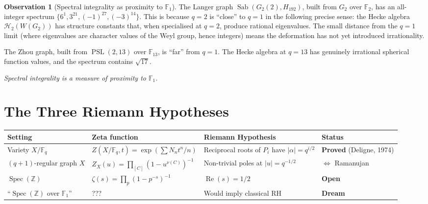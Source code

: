 \documentclass[11pt,a4paper]{article}
\theoremstyle{plain}
\theoremstyle{definition}
\newtheorem{observation}[theorem]{Observation}
\newcommand{\Z}{\mathbb{Z}}
\newcommand{\F}{\mathbb{F}}
\newcommand{\Sab}{\operatorname{Sab}}
\newcommand{\PSL}{\operatorname{PSL}}
\newcommand{\Spec}{\operatorname{Spec}}
\begin{document}
\begin{tcolorbox}[colback=yellow!12, colframe=yellow!12,
  boxrule=0pt, sharp corners]
\begin{observation}[Spectral integrality as proximity to $\F_1$]
\label{obs:integrality}
The Langer graph $\Sab(G_2(2), H_{192})$, built from $G_2$ over
$\F_2$, has an all-integer spectrum $\{6^1, 3^{21}, (-1)^{27},
(-3)^{14}\}$. This is because $q = 2$ is ``close'' to $q = 1$ in the
following precise sense: the Hecke algebra $\mathcal{H}_2(W(G_2))$
has structure constants that, when specialised at $q = 2$, produce
rational eigenvalues. The small distance from the $q = 1$ limit
(where eigenvalues are character values of the Weyl group, hence
integers) means the deformation has not yet introduced
irrationality.

The Zhou graph, built from $\PSL(2,13)$ over $\F_{13}$, is ``far''
from $q = 1$. The Hecke algebra at $q = 13$ has genuinely irrational
spherical function values, and the spectrum contains $\sqrt{17}$.

\emph{Spectral integrality is a measure of proximity to $\F_1$.}
\end{observation}
\end{tcolorbox}


\section{The Three Riemann Hypotheses}
\label{sec:three-rh}

\begin{tcolorbox}[breakable, colback=black!5, colframe=black!5,
  boxrule=0pt, sharp corners]
\begin{center}
\renewcommand{\arraystretch}{1.6}
\begin{tabular}{@{}p{2.5cm} p{3.5cm} p{4cm} p{2.5cm}@{}}
\toprule
Setting & Zeta function & Riemann Hypothesis & Status \\
\midrule
Variety $X/\F_q$
  & $Z(X/\F_q, t) = \exp(\sum N_n t^n/n)$
  & Reciprocal roots of $P_i$ have $|\alpha| = q^{i/2}$
  & \textbf{Proved} (Deligne, 1974) \\
$(q{+}1)$-regular graph $X$
  & $Z_X(u) = \prod_{[C]}(1-u^{\nu(C)})^{-1}$
  & Non-trivial poles at $|u| = q^{-1/2}$
  & $\Leftrightarrow$ Ramanujan \\
$\Spec(\Z)$
  & $\zeta(s) = \prod_p (1-p^{-s})^{-1}$
  & $\operatorname{Re}(s) = 1/2$
  & \textbf{Open} \\
``$\Spec(\Z)$ over $\F_1$''
  & ???
  & Would imply classical RH
  & \textbf{Dream} \\
\bottomrule
\end{tabular}
\end{center}
\end{tcolorbox}
\end{document}

